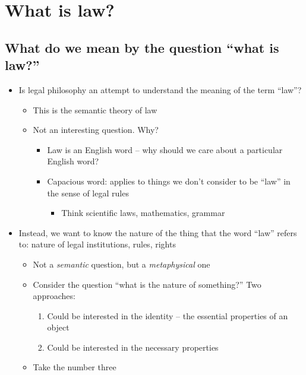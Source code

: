 \hypertarget{what-is-law}{%
\section{What is law?}\label{what-is-law}}

\hypertarget{what-do-we-mean-by-the-question-what-is-law}{%
\subsection{What do we mean by the question ``what is
law?''}\label{what-do-we-mean-by-the-question-what-is-law}}

\begin{itemize}
\tightlist
\item
  Is legal philosophy an attempt to understand the meaning of the term
  ``law''?

  \begin{itemize}
  \tightlist
  \item
    This is the semantic theory of law
  \item
    Not an interesting question. Why?

    \begin{itemize}
    \tightlist
    \item
      Law is an English word -- why should we care about a particular
      English word?
    \item
      Capacious word: applies to things we don't consider to be ``law''
      in the sense of legal rules

      \begin{itemize}
      \tightlist
      \item
        Think scientific laws, mathematics, grammar
      \end{itemize}
    \end{itemize}
  \end{itemize}
\item
  Instead, we want to know the nature of the thing that the word ``law''
  refers to: nature of legal institutions, rules, rights

  \begin{itemize}
  \tightlist
  \item
    Not a \emph{semantic} question, but a \emph{metaphysical} one
  \item
    Consider the question ``what is the nature of something?'' Two
    approaches:

    \begin{enumerate}
    \def\labelenumi{\arabic{enumi}.}
    \tightlist
    \item
      Could be interested in the identity -- the essential properties of
      an object
    \item
      Could be interested in the necessary properties
    \end{enumerate}
  \item
    Take the number three


\end{itemize}
\end{itemize}
